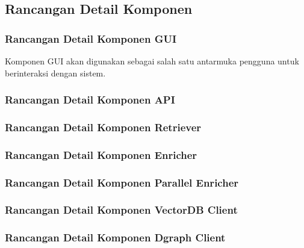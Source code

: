 \subsection{Rancangan Detail Komponen}

\subsubsection{Rancangan Detail Komponen GUI}

Komponen GUI akan digunakan sebagai salah satu antarmuka pengguna untuk berinteraksi dengan sistem. 


\subsubsection{Rancangan Detail Komponen API}


\subsubsection{Rancangan Detail Komponen Retriever}


\subsubsection{Rancangan Detail Komponen Enricher}

\subsubsection{Rancangan Detail Komponen Parallel Enricher}

\subsubsection{Rancangan Detail Komponen VectorDB Client}

\subsubsection{Rancangan Detail Komponen Dgraph Client}



